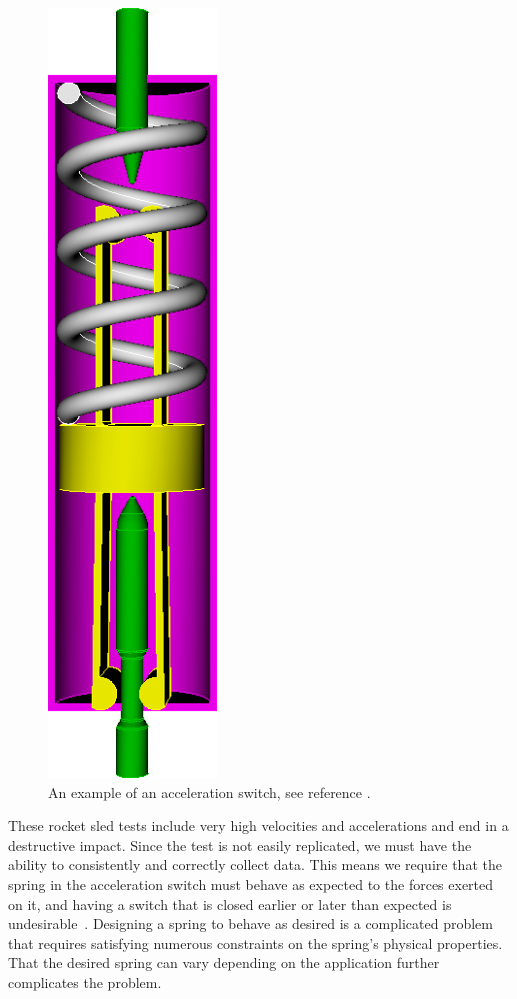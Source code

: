 \documentclass[10pt]{article}
\begin{document}
		\begin{figure}[h]
		 \begin{center}\includegraphics[scale=.2]{Acceleration_Switch.png}\end{center}
		 \caption{An example of an acceleration switch, see reference \cite{Massad2015}.}
		 \label{fig:Acceleration_Switch}
		 
		 \end{figure}	 
		
These rocket sled tests include very high velocities and accelerations and end in a destructive impact. Since the test is not easily replicated, we must have the ability to consistently and correctly collect data. This means we require that the spring in the acceleration switch must behave as expected to the forces exerted on it, and having a switch that is closed earlier or later than expected is undesirable~\cite{IMSM2010}. Designing a spring to behave as desired is a complicated problem that requires satisfying numerous constraints on the spring's physical properties. That the desired spring can vary depending on the application further complicates the problem. 
\end{document}
